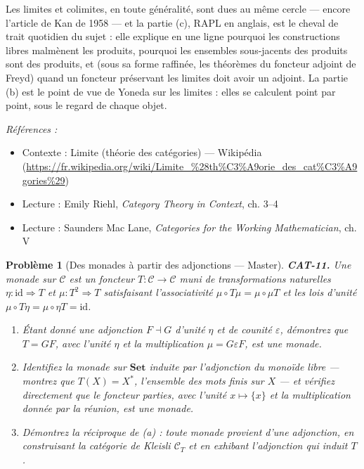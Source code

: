\documentclass[11pt]{article}
\newtheorem{problem}{Problème}
\newenvironment{refs}{\par\small\noindent\emph{Références :}\begin{itemize}\setlength\itemsep{0pt}}{\end{itemize}\normalsize}
\begin{document}
\noindent Les limites et colimites, en toute généralité, sont dues au même cercle --- encore
l'article de Kan de 1958 --- et la partie (c), \og{} RAPL \fg{} en anglais, est le cheval de trait quotidien
du sujet : elle explique en une ligne pourquoi les constructions libres malmènent les produits,
pourquoi les ensembles sous-jacents des produits sont des produits, et (sous sa forme raffinée,
les théorèmes du foncteur adjoint de Freyd) quand un foncteur préservant les limites doit avoir un
adjoint. La partie (b) est le point de vue de Yoneda sur les limites : elles se calculent point par
point, sous le regard de chaque objet.

\begin{refs}
\item Contexte : Limite (théorie des catégories) --- Wikipédia (\url{https://fr.wikipedia.org/wiki/Limite_%28th%C3%A9orie_des_cat%C3%A9gories%29})
\item Lecture : Emily Riehl, \textit{Category Theory in Context}, ch. 3--4
\item Lecture : Saunders Mac Lane, \textit{Categories for the Working Mathematician}, ch. V
\end{refs}

\bigskip

\begin{problem}[{Des monades à partir des adjonctions --- Master}]
\textbf{CAT-11.} Une \textit{monade} sur $ \mathcal{C} $ est un foncteur
$ T\colon \mathcal{C} \to \mathcal{C} $ muni de transformations naturelles
$ \eta\colon \mathrm{id} \Rightarrow T $ et $ \mu\colon T^2 \Rightarrow T $ satisfaisant
l'associativité $ \mu \circ T\mu = \mu \circ \mu T $ et les lois d'unité
$ \mu \circ T\eta = \mu \circ \eta T = \mathrm{id} $.
\begin{enumerate}
\item[(a)] Étant donné une adjonction
$ F \dashv G $ d'unité $ \eta $ et de counité $ \varepsilon $, démontrez que
$ T = GF $, avec l'unité $ \eta $ et la multiplication $ \mu = G \varepsilon F $, est une
monade.
\item[(b)] Identifiez la monade sur $ \mathbf{Set} $ induite par l'adjonction du monoïde libre ---
montrez que $ T(X) = X^{*} $, l'ensemble des mots finis sur $ X $ --- et vérifiez directement
que le foncteur parties, avec l'unité $ x \mapsto \{x\} $ et la multiplication donnée par la
réunion, est une monade.
\item[(c)] Démontrez la réciproque de (a) : toute monade provient d'une adjonction, en construisant
la catégorie de Kleisli $ \mathcal{C}_T $ et en exhibant l'adjonction qui induit
$ T $.
\end{enumerate}

\end{problem}
\end{document}
